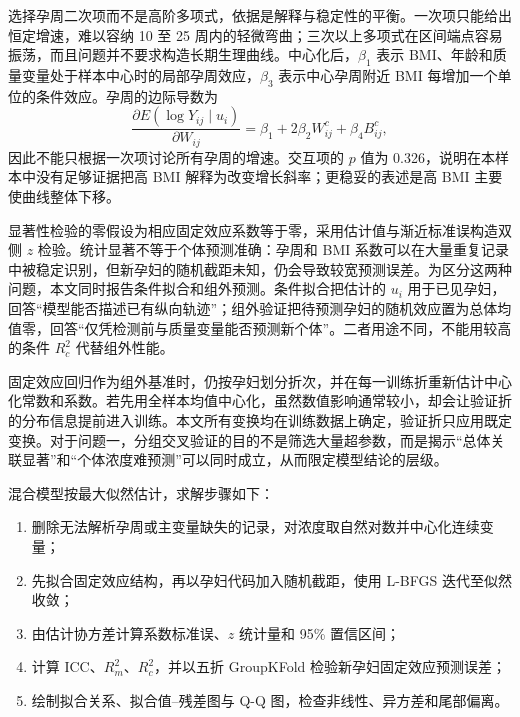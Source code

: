 \documentclass[UTF8,a4paper,12pt]{ctexart}
\begin{document}
选择孕周二次项而不是高阶多项式，依据是解释与稳定性的平衡。一次项只能给出恒定增速，难以容纳 10 至 25 周内的轻微弯曲；三次以上多项式在区间端点容易振荡，而且问题并不要求构造长期生理曲线。中心化后，$\beta_1$ 表示 BMI、年龄和质量变量处于样本中心时的局部孕周效应，$\beta_3$ 表示中心孕周附近 BMI 每增加一个单位的条件效应。孕周的边际导数为
\begin{equation}
\frac{\partial E(\log Y_{ij}\mid u_i)}{\partial W_{ij}}
=\beta_1+2\beta_2W^c_{ij}+\beta_4B^c_{ij},
\label{eq:weekderivative}
\end{equation}
因此不能只根据一次项讨论所有孕周的增速。交互项的 $p$ 值为 0.326，说明在本样本中没有足够证据把高 BMI 解释为改变增长斜率；更稳妥的表述是高 BMI 主要使曲线整体下移。

显著性检验的零假设为相应固定效应系数等于零，采用估计值与渐近标准误构造双侧 $z$ 检验。统计显著不等于个体预测准确：孕周和 BMI 系数可以在大量重复记录中被稳定识别，但新孕妇的随机截距未知，仍会导致较宽预测误差。为区分这两种问题，本文同时报告条件拟合和组外预测。条件拟合把估计的 $u_i$ 用于已见孕妇，回答“模型能否描述已有纵向轨迹”；组外验证把待预测孕妇的随机效应置为总体均值零，回答“仅凭检测前与质量变量能否预测新个体”。二者用途不同，不能用较高的条件 $R_c^2$ 代替组外性能。

固定效应回归作为组外基准时，仍按孕妇划分折次，并在每一训练折重新估计中心化常数和系数。若先用全样本均值中心化，虽然数值影响通常较小，却会让验证折的分布信息提前进入训练。本文所有变换均在训练数据上确定，验证折只应用既定变换。对于问题一，分组交叉验证的目的不是筛选大量超参数，而是揭示“总体关联显著”和“个体浓度难预测”可以同时成立，从而限定模型结论的层级。

混合模型按最大似然估计，求解步骤如下：
\begin{enumerate}
  \item 删除无法解析孕周或主变量缺失的记录，对浓度取自然对数并中心化连续变量；
  \item 先拟合固定效应结构，再以孕妇代码加入随机截距，使用 L-BFGS 迭代至似然收敛；
  \item 由估计协方差计算系数标准误、$z$ 统计量和 95\% 置信区间；
  \item 计算 ICC、$R_m^2$、$R_c^2$，并以五折 GroupKFold 检验新孕妇固定效应预测误差；
  \item 绘制拟合关系、拟合值--残差图与 Q-Q 图，检查非线性、异方差和尾部偏离。
\end{enumerate}
\end{document}
